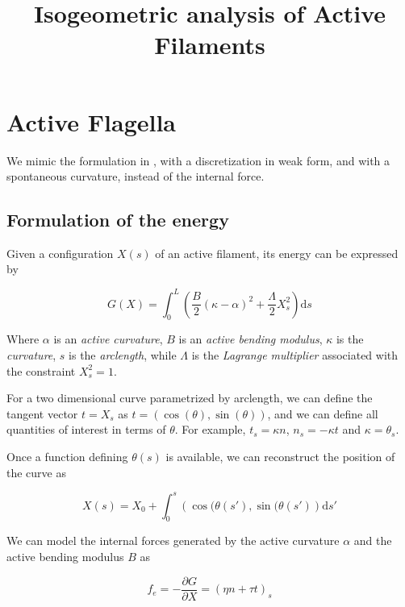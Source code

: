 
\usepackage{amsmath}
\usepackage{graphicx}

\graphicspath{{./figures/}}

\renewcommand{\d}{\mathrm{d}}
\newcommand{\vv}[1]{\boldsymbol{#1}}





\title{Isogeometric analysis of Active Filaments}

\section{Active Flagella}\label{active-flagella}

We mimic the formulation in \cite{CamaletJulicher2000}, with a
discretization in weak form, and with a spontaneous curvature, instead
of the internal force.

\subsection{Formulation of the energy}\label{formulation-of-the-energy}

Given a configuration \(X(s)\) of an active filament, its energy can be expressed by

\[G(X) = \int_0^L \left( \frac{B}{2}(\kappa-\alpha)^2 +
  \frac{\Lambda}{2} X_s^2 \right) \d s\]

Where $\alpha$ is an \emph{active curvature}, $B$ is an \emph{active
  bending modulus}, $\kappa$ is the \emph{curvature}, $s$ is the
\emph{arclength}, while $\Lambda$ is the \emph{Lagrange multiplier}
associated with the constraint $X_s^2 = 1$.

For a two dimensional curve parametrized by arclength, we can define
the tangent vector $t = X_s$ as $t = (\cos(\theta), \sin(\theta))$, and
we can define all quantities of interest in terms of $\theta$. For
example, $t_s = \kappa n$, $n_s = -\kappa t$ and $\kappa = \theta_s$.

Once a function defining \(\theta(s)\) is available, we can reconstruct
the position of the curve as

\[X(s) = X_0 + \int_0^s \left(\cos(\theta(s'), \sin(\theta(s') \right)
\d s'\]

We can model the internal forces generated by the active curvature
$\alpha$ and the active bending modulus $B$ as

\[f_e = -\frac{\partial G}{\partial X} = (\eta n + \tau t)_s\]

